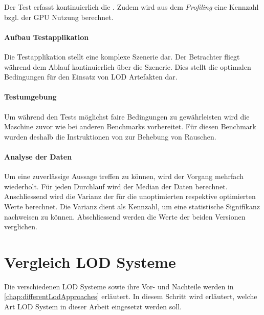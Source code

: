 Der Test erfasst kontinuierlich die . Zudem wird aus dem \emph{Profiling} eine Kennzahl bzgl. der GPU Nutzung berechnet.

\paragraph{Aufbau Testapplikation}
Die Testapplikation stellt eine komplexe Szenerie dar. Der Betrachter fliegt während dem Ablauf kontinuierlich über die Szenerie. Dies stellt die optimalen Bedingungen für den Einsatz von LOD Artefakten dar.

\paragraph{Testumgebung}
Um während den Tests möglichst faire Bedingungen zu gewährleisten wird die Maschine zuvor wie bei anderen Benchmarks vorbereitet. Für diesen Benchmark wurden deshalb die Instruktionen von  zur Behebung von Rauschen.
\cite{tracerBenchNoiseMitigation}

\paragraph{Analyse der Daten}
Um eine zuverlässige Aussage treffen zu können, wird der Vorgang mehrfach wiederholt. Für jeden Durchlauf wird der Median der  Daten berechnet.
Anschliessend wird die Varianz der  für die unoptimierten respektive optimierten Werte berechnet. Die Varianz dient als Kennzahl, um eine statistische Signifikanz nachweisen zu können. Abschliessend werden die Werte der beiden Versionen verglichen.

\section{Vergleich LOD Systeme}
Die verschiedenen LOD Systeme sowie ihre Vor- und Nachteile werden in \autoref{chap:differentLodApproaches} erläutert. In diesem Schritt wird erläutert, welche Art LOD System in dieser Arbeit eingesetzt werden soll.


